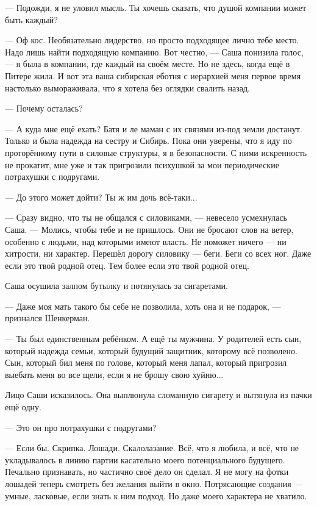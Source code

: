 \documentclass[a4paper,10pt,fleqn]{book}\usepackage{polyglossia}\setdefaultlanguage{english}\setotherlanguage{russian}\defaultfontfeatures{Ligatures=TeX,Mapping=tex-text} \usepackage{xcolor}\definecolor{lightgray}{HTML}{bbbbbb}\color{lightgray}\newcommand{\ml}[3]{\textcolor{black}{#3}}
\begin{document}
--- Подожди, я не уловил мысль.
Ты хочешь сказать, что душой компании может быть каждый?

--- Оф кос.
Необязательно лидерство, но просто подходящее лично тебе место.
Надо лишь найти подходящую компанию.
Вот честно, --- Саша понизила голос, --- я была в компании, где каждый на своём месте.
Но не здесь, когда ещё в Питере жила.
И вот эта ваша сибирская еботня с иерархией меня первое время настолько вымораживала, что я хотела без оглядки свалить назад.

--- Почему осталась?

--- А куда мне ещё ехать?
Батя и ле маман с их связями из-под земли достанут.
Только и была надежда на сестру и Сибирь.
Пока они уверены, что я иду по проторённому пути в силовые структуры, я в безопасности.
С ними искренность не прокатит, мне уже и так пригрозили психушкой за мои периодические потрахушки с подругами.

--- До этого может дойти?
Ты ж им дочь всё-таки...

--- Сразу видно, что ты не общался с силовиками, --- невесело усмехнулась Саша.
--- Молись, чтобы тебе и не пришлось.
Они не бросают слов на ветер, особенно с людьми, над которыми имеют власть.
Не поможет ничего --- ни хитрости, ни характер.
Перешёл дорогу силовику --- беги.
Беги со всех ног.
Даже если это твой родной отец.
Тем более если это твой родной отец.

Саша осушила залпом бутылку и потянулась за сигаретами.

--- Даже моя мать такого бы себе не позволила, хоть она и не подарок, --- признался Шенкерман.

--- Ты был единственным ребёнком.
А ещё ты мужчина.
У родителей есть сын, который надежда семьи, который будущий защитник, которому всё позволено.
Сын, который бил меня по голове, который меня лапал, который пригрозил выебать меня во все щели, если я не брошу свою хуйню...

Лицо Саши исказилось.
Она выплюнула сломанную сигарету и вытянула из пачки ещё одну.

--- Это он про потрахушки с подругами?

--- Если бы.
Скрипка.
Лошади.
Скалолазание.
Всё, что я любила, и всё, что не укладывалось в линию партии касательно моего потенциального будущего.
Печально признавать, но частично своё дело он сделал.
Я не могу на фотки лошадей теперь смотреть без желания выйти в окно.
Потрясающие создания --- умные, ласковые, если знать к ним подход.
Но даже моего характера не хватило.
\end{document}
